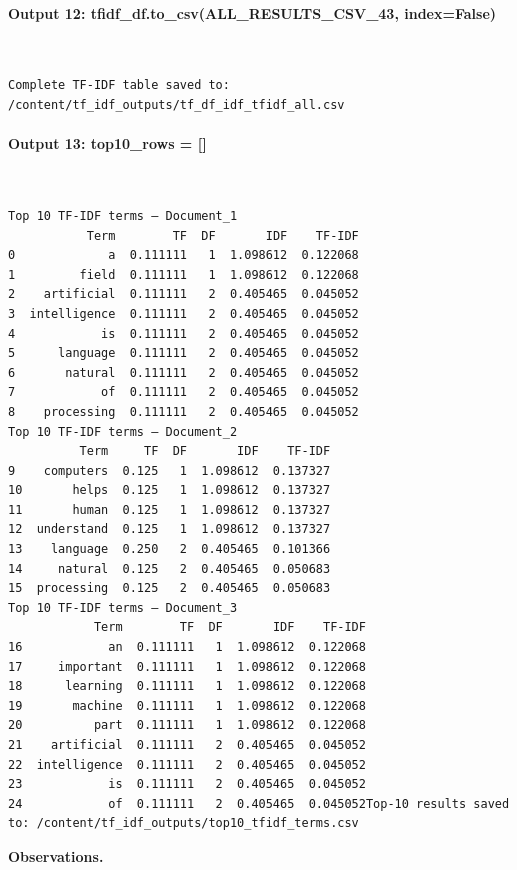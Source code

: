 \documentclass[12pt,a4paper,oneside]{report}
\begin{document}
\paragraph{Output 12: tfidf\_df.to\_csv(ALL\_RESULTS\_CSV\_43, index=False)}\mbox{}\\[-1ex]
\begin{Verbatim}[commandchars=\\\{\},breaklines=true,breakanywhere=true,fontsize=\scriptsize,frame=leftline,framesep=2mm,rulecolor=\color{gray}]
Complete TF-IDF table saved to: /content/tf_idf_outputs/tf_df_idf_tfidf_all.csv
\end{Verbatim}
\paragraph{Output 13: top10\_rows = []}\mbox{}\\[-1ex]
\begin{Verbatim}[commandchars=\\\{\},breaklines=true,breakanywhere=true,fontsize=\scriptsize,frame=leftline,framesep=2mm,rulecolor=\color{gray}]
Top 10 TF-IDF terms — Document_1
           Term        TF  DF       IDF    TF-IDF
0             a  0.111111   1  1.098612  0.122068
1         field  0.111111   1  1.098612  0.122068
2    artificial  0.111111   2  0.405465  0.045052
3  intelligence  0.111111   2  0.405465  0.045052
4            is  0.111111   2  0.405465  0.045052
5      language  0.111111   2  0.405465  0.045052
6       natural  0.111111   2  0.405465  0.045052
7            of  0.111111   2  0.405465  0.045052
8    processing  0.111111   2  0.405465  0.045052
Top 10 TF-IDF terms — Document_2
          Term     TF  DF       IDF    TF-IDF
9    computers  0.125   1  1.098612  0.137327
10       helps  0.125   1  1.098612  0.137327
11       human  0.125   1  1.098612  0.137327
12  understand  0.125   1  1.098612  0.137327
13    language  0.250   2  0.405465  0.101366
14     natural  0.125   2  0.405465  0.050683
15  processing  0.125   2  0.405465  0.050683
Top 10 TF-IDF terms — Document_3
            Term        TF  DF       IDF    TF-IDF
16            an  0.111111   1  1.098612  0.122068
17     important  0.111111   1  1.098612  0.122068
18      learning  0.111111   1  1.098612  0.122068
19       machine  0.111111   1  1.098612  0.122068
20          part  0.111111   1  1.098612  0.122068
21    artificial  0.111111   2  0.405465  0.045052
22  intelligence  0.111111   2  0.405465  0.045052
23            is  0.111111   2  0.405465  0.045052
24            of  0.111111   2  0.405465  0.045052Top-10 results saved to: /content/tf_idf_outputs/top10_tfidf_terms.csv
\end{Verbatim}
\textbf{Observations.}
\end{document}
